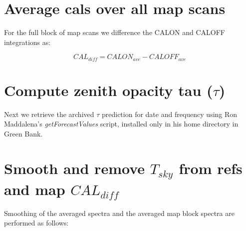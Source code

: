 \documentclass[11pt]{article}
\begin{document}
\section{Average cals over all map scans}

For the full block of map scans we difference the CALON and CALOFF integrations as:

\begin{equation}
CAL_{diff} = CALON_{ave} - CALOFF_{ave}
\end{equation}

\section{Compute zenith opacity tau ($\tau$)}

Next we retrieve the archived $\tau$ prediction for date and frequency using Ron Maddalena's {\it getForecastValues} script, installed only in his home directory in Green Bank.

\section{Smooth and remove $T_{sky}$ from refs and map $CAL_{diff}$}

Smoothing of the averaged spectra and the averaged map block spectra are performed as follows:
\end{document}
